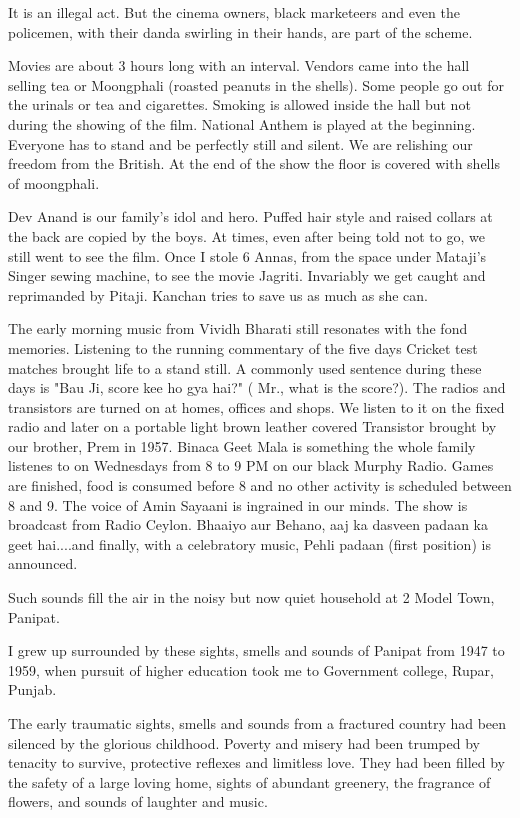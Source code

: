 It is an illegal act. But the cinema owners, black marketeers and even the
policemen, with their danda swirling in their hands, are part of the
scheme. 

Movies are about 3 hours long with an interval. Vendors came into the hall
selling tea or Moongphali (roasted peanuts in the shells). Some people go
out for the urinals or tea and cigarettes. Smoking is allowed inside the
hall but not during the showing of the film. National Anthem is played at
the beginning. Everyone has to stand and be perfectly still and silent. We
are relishing our freedom from the British. At the end of the show the
floor is covered with shells of moongphali. 

Dev Anand is our family's idol and hero. Puffed hair style and raised
collars at the back are copied by the boys. At times, even after being
told not to go, we still went to see the film. Once I stole 6 Annas, from
the space under Mataji's Singer sewing machine, to see the movie Jagriti.
Invariably we get caught and reprimanded by Pitaji. Kanchan tries to save
us as much as she can. 

The early morning music from Vividh Bharati still resonates with the fond
memories. Listening to the running commentary of the five days Cricket
test matches brought life to a stand still. A commonly used sentence
during these days is "Bau Ji, score kee ho gya hai?" ( Mr., what is the
score?). The radios and transistors are turned on at homes, offices and
shops. We listen to it on the fixed radio and later on a portable light
brown leather covered Transistor brought by our brother, Prem in 1957.
Binaca Geet Mala is something the whole family listenes to on Wednesdays
from 8 to 9 PM on our black Murphy Radio. Games are finished, food is
consumed before 8 and no other activity is scheduled between 8 and 9. The
voice of Amin Sayaani is ingrained in our minds. The show is broadcast
from Radio Ceylon. Bhaaiyo aur Behano, aaj ka dasveen padaan ka geet
hai....and finally, with a celebratory music, Pehli padaan (first
position) is announced. 

Such sounds fill the air in the noisy but now quiet household at 2 Model
Town, Panipat. 

I grew up surrounded by these sights, smells and sounds of Panipat from
1947 to 1959, when pursuit of higher education took me to Government
college, Rupar, Punjab. 

The early traumatic sights, smells and sounds from a fractured country had
been silenced by the glorious childhood. Poverty and misery had been
trumped by tenacity to survive, protective reflexes and limitless love.
They had been filled by the safety of a large loving home, sights of
abundant greenery, the fragrance of flowers, and sounds of laughter and
music. 

